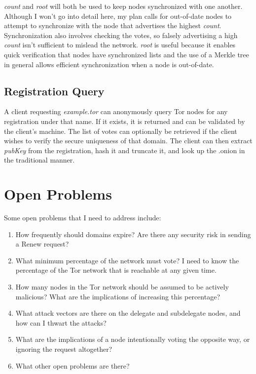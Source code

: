 \documentclass[journal]{IEEEtran}
\begin{document}
\textit{count} and \textit{root} will both be used to keep nodes synchronized with one another. Although I won't go into detail here, my plan calls for out-of-date nodes to attempt to synchronize with the node that advertises the highest \textit{count}. Synchronization also involves checking the votes, so falsely advertising a high \textit{count} isn't sufficient to mislead the network. \textit{root} is useful because it enables quick verification that nodes have synchronized lists and the use of a Merkle tree in general allows efficient synchronization when a node is out-of-date.

\subsection{Registration Query}

A client requesting \textit{example.tor} can anonymously query Tor nodes for any registration under that name. If it exists, it is returned and can be validated by the client's machine. The list of votes can optionally be retrieved if the client wishes to verify the secure uniqueness of that domain. The client can then extract \textit{pubKey} from the registration, hash it and truncate it, and look up the .onion in the traditional manner.

\section{Open Problems}

Some open problems that I need to address include:

\begin{enumerate}
	\item How frequently should domains expire? Are there any security risk in sending a Renew request?
	\item What minimum percentage of the network must vote? I need to know the percentage of the Tor network that is reachable at any given time.
	\item How many nodes in the Tor network should be assumed to be actively malicious? What are the implications of increasing this percentage?
	\item What attack vectors are there on the delegate and subdelegate nodes, and how can I thwart the attacks?
	\item What are the implications of a node intentionally voting the opposite way, or ignoring the request altogether?
	\item What other open problems are there?
\end{enumerate}
\end{document}
